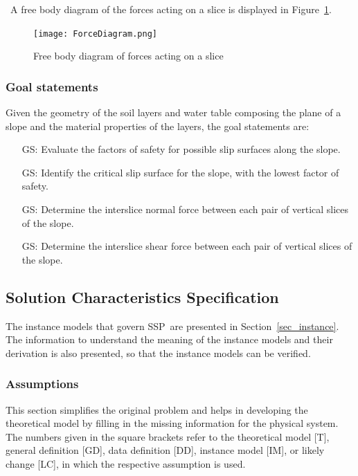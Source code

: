 \documentclass[12pt]{article}
\newcommand{\progname}{SSP}
\newcounter{goalnum} %
\begin{document}
~\newline\noindent A free body diagram of the forces acting on a
slice is displayed in Figure~\ref{Fig_Forces}.

\begin{figure}[h!]
\begin{center}
{
 \texttt{[image: ForceDiagram.png]}
}
\caption{Free body diagram of forces acting on a slice}
\label{Fig_Forces}
\end{center}
\end{figure}

\subsubsection{Goal statements}

Given the geometry of the soil layers and water table composing the plane of a 
slope and the material properties of the layers, the goal statements are:

\begin{itemize}
\item [GS\refstepcounter{goalnum}\thegoalnum: \label{G_FS}]
  {Evaluate the factors of safety for possible slip surfaces along the slope.}
  
\item [GS\refstepcounter{goalnum}\thegoalnum: \label{G_Critical}]
  {Identify the critical slip surface for the slope, with the lowest factor of 
  safety.}

\item [GS\refstepcounter{goalnum}\thegoalnum: \label{G_Normal}]
  {Determine the interslice normal force between each pair of vertical slices   
  of the slope.}
  
\item [GS\refstepcounter{goalnum}\thegoalnum: \label{G_Shear}]
  {Determine the interslice shear force between each pair of vertical slices of 
  the slope.} 
\end{itemize}

\subsection{Solution Characteristics Specification}

The instance models that govern \progname\ are presented in
Section~\ref{sec_instance}.  The information to understand the
meaning of the instance models and their derivation is also presented,
so that the instance models can be verified.

\subsubsection{Assumptions}
\label{Assumptions}
This section simplifies the original problem and helps in developing the
theoretical model by filling in the missing information for the physical
system. The numbers given in the square brackets refer to the theoretical model
[T], general definition [GD], data definition [DD], instance model [IM], or
likely change [LC], in which the respective assumption is used.
\end{document}

